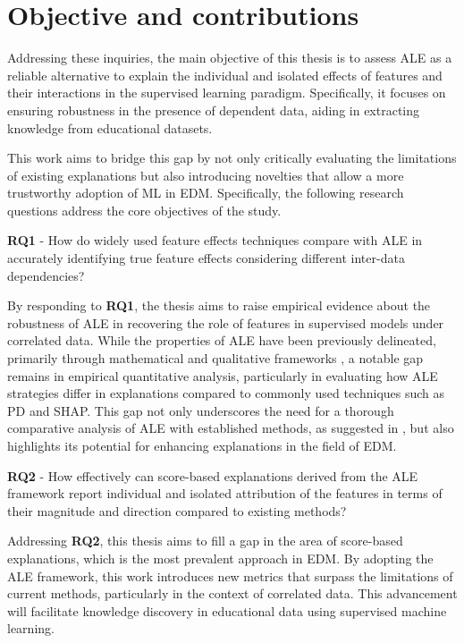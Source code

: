 \section{Objective and contributions}
\label{objetivos}

Addressing these inquiries, the main objective of this thesis is to assess ALE as a reliable alternative to explain the individual and isolated effects of features and their interactions in the supervised learning paradigm. Specifically, it focuses on ensuring robustness in the presence of dependent data, aiding in extracting knowledge from educational datasets.


This work aims to bridge this gap by not only critically evaluating the limitations of existing explanations but also introducing novelties that allow a more trustworthy adoption of ML in EDM. Specifically, the following research questions address the core objectives of the study.

\textbf{RQ1} - How do widely used feature effects techniques compare with ALE in accurately identifying true feature effects considering different inter-data dependencies? 

By responding to \textbf{RQ1}, the thesis aims to raise empirical evidence about the robustness of ALE in recovering the role of features in supervised models under correlated data. While the properties of ALE have been previously delineated, primarily through mathematical and qualitative frameworks \cite{Apley2020VisualizingModels, molnar2019}, a notable gap remains in empirical quantitative analysis, particularly in evaluating how ALE strategies differ in explanations compared to commonly used techniques such as PD and SHAP. This gap not only underscores the need for a thorough comparative analysis of ALE with established methods, as suggested in \cite{Molnar2022GeneralModels}, but also highlights its potential for enhancing explanations in the field of EDM.


\textbf{RQ2} - How effectively can score-based explanations derived from the ALE framework report individual and isolated attribution of the features in terms of their magnitude and direction compared to existing methods?

Addressing \textbf{RQ2}, this thesis aims to fill a gap in the area of score-based explanations, which is the most prevalent approach in EDM.  By adopting the ALE framework, this work introduces new metrics that surpass the limitations of current methods, particularly in the context of correlated data. This advancement will facilitate knowledge discovery in educational data using supervised machine learning.  

